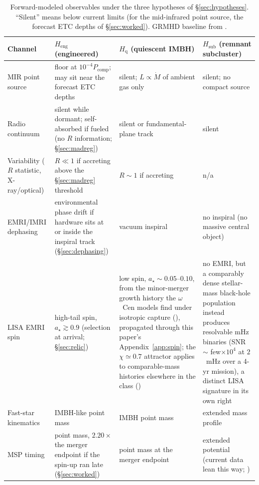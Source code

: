 \documentclass[11pt]{article}
\newcommand{\astar}{\ensuremath{a_\star}}
\newcommand{\ocen}{\ensuremath{\omega}~Cen}
\newcommand{\Heng}{\ensuremath{H_{\mathrm{eng}}}}
\newcommand{\Hgas}{\ensuremath{H_{\mathrm{q}}}}
\newcommand{\Hsub}{\ensuremath{H_{\mathrm{sub}}}}
\begin{document}
\begin{table}[htbp]
\centering
\small
\caption{Forward-modeled observables under the three hypotheses of \S\ref{sec:hypotheses}. ``Silent'' means below current limits (for the mid-infrared point source, the forecast ETC depths of \S\ref{sec:worked}). GRMHD baseline from \citet{Universe2026MAD}.}
\label{tab:residue}
\begin{tabular}{p{3.4cm}p{3.5cm}p{3.5cm}p{3.5cm}}
\toprule
Channel & \Heng{} (engineered) & \Hgas{} (quiescent IMBH) & \Hsub{} (remnant subcluster) \\
\midrule
MIR point source & floor at $10^{-4}P_{\mathrm{comp}}$; may sit near the forecast ETC depths & silent; $L \propto \dot{M}$ of ambient gas only & silent; no compact source \\
Radio continuum & silent while dormant; self-absorbed if fueled (no $R$ information; \S\ref{sec:madreg}) & silent or fundamental-plane track \citep{Mahida2026} & silent \\
Variability ($R$ statistic, X-ray/optical) & $R \ll 1$ if accreting above the \S\ref{sec:madreg} threshold & $R \sim 1$ if accreting & n/a \\
EMRI/IMRI dephasing & environmental phase drift if hardware sits at or inside the inspiral track (\S\ref{sec:dephasing}) & vacuum inspiral & no inspiral (no massive central object) \\
LISA EMRI spin & high-tail spin, $\astar \gtrsim 0.9$ (selection at arrival; \S\ref{sec:relic}) & low spin, $\astar \sim 0.05$--$0.10$, from the minor-merger growth history the \ocen{} models find under isotropic capture (\citealt{GonzalezPrieto2025}), propagated through this paper's Appendix~\ref{app:spin}; the $\chi \simeq 0.7$ attractor applies to comparable-mass histories elsewhere in the class (\citealt{Fishbach2017,GerosaBerti2017}) & no EMRI, but a comparably dense stellar-mass black-hole population instead produces resolvable mHz binaries (SNR $\sim$ few$\times10^{4}$ at $2$~mHz over a 4-yr mission), a distinct LISA signature in its own right \\
Fast-star kinematics & IMBH-like point mass & IMBH point mass & extended mass profile \\
MSP timing & point mass, $2.20\times$ the merger endpoint if the spin-up ran late (\S\ref{sec:worked}) & point mass at the merger endpoint & extended potential (current data lean this way; \citealt{BanaresHernandez2025,ColomiBernadich2026}) \\
\bottomrule
\end{tabular}
\end{table}
\end{document}
